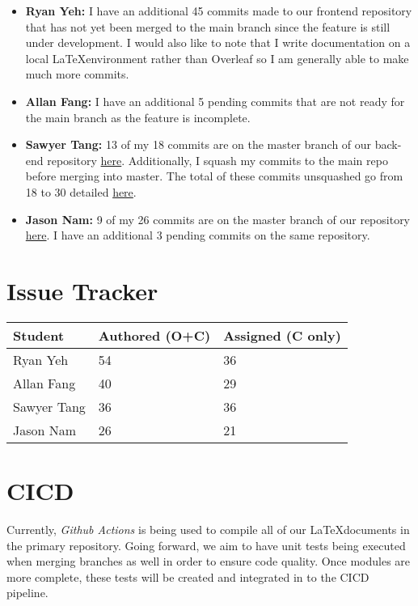 \documentclass{article}
\begin{document}
\begin{itemize}
  \item \textbf{Ryan Yeh:} I have an additional 45 commits made to our frontend repository that has not yet been
  merged to the main branch since the feature is still under development. I would also like to note that I write
  documentation on a local \LaTeX environment rather than Overleaf so I am generally able to make much more commits.
  \item \textbf{Allan Fang:} I have an additional 5 pending commits that are not ready for the main branch as the feature is incomplete.
  \item \textbf{Sawyer Tang:} 13 of my 18 commits are on the master branch of our back-end repository \href{https://github.com/Tanger71/grocery-spending-tracker-backend}{here}. Additionally, I squash my commits to the main repo before merging into master. The total of these commits unsquashed go from 18 to 30 detailed \href{https://github.com/r-yeh/grocery-spending-tracker/commits?author=Tanger71&since=2023-11-13&until=2024-01-28}{here}.
  \item \textbf{Jason Nam:} 9 of my 26 commits are on the master branch of our repository \href{https://github.com/jason-nam/grocery-web-scraper}{here}. I have an additional 3 pending commits on the same repository.
\end{itemize}

\section{Issue Tracker}


\begin{table}[H]
\centering
\begin{tabular}{lll}
\toprule
\textbf{Student} & \textbf{Authored (O+C)} & \textbf{Assigned (C only)}\\
\midrule
Ryan Yeh & 54 & 36 \\
Allan Fang & 40 & 29 \\
Sawyer Tang & 36 & 36 \\
Jason Nam & 26 & 21 \\
\bottomrule
\end{tabular}
\end{table}


\section{CICD}

Currently, \textit{Github Actions} is being used to compile all of our \LaTeX documents in the primary repository.
Going forward, we aim to have unit tests being executed when merging branches as well in order to ensure code quality.
Once modules are more complete, these tests will be created and integrated in to the CICD pipeline.
\end{document}
